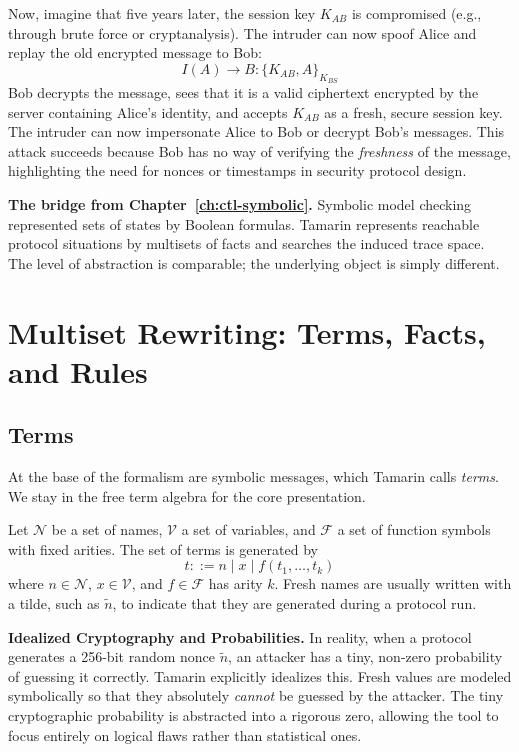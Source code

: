 Now, imagine that five years later, the session key $K_{AB}$ is compromised (e.g., through brute force or cryptanalysis). The intruder can now spoof Alice and replay the old encrypted message to Bob:
\[
  I(A) \to B : \{K_{AB}, A\}_{K_{BS}}
\]
Bob decrypts the message, sees that it is a valid ciphertext encrypted by the server containing Alice's identity, and accepts $K_{AB}$ as a fresh, secure session key. The intruder can now impersonate Alice to Bob or decrypt Bob's messages. This attack succeeds because Bob has no way of verifying the \emph{freshness} of the message, highlighting the need for nonces or timestamps in security protocol design.

\medskip\noindent
\textbf{The bridge from Chapter~\ref{ch:ctl-symbolic}.}  Symbolic model
checking represented sets of states by Boolean formulas.  Tamarin represents
reachable protocol situations by multisets of facts and searches the induced
trace space.  The level of abstraction is comparable; the underlying object
is simply different.


\section{Multiset Rewriting: Terms, Facts, and Rules}
\label{sec:tamarin-msr}

\subsection{Terms}

At the base of the formalism are symbolic messages, which Tamarin calls
\emph{terms}.  We stay in the free term algebra for the core presentation.

\begin{definition}[Terms]
\label{def:tamarin-terms}
Let $\mathcal{N}$ be a set of names, $\mathcal{V}$ a set of variables, and
$\mathcal{F}$ a set of function symbols with fixed arities.  The set of
terms is generated by
\[
  t ::= n \mid x \mid f(t_1,\dots,t_k)
\]
where $n \in \mathcal{N}$, $x \in \mathcal{V}$, and $f \in \mathcal{F}$ has
arity $k$.  Fresh names are usually written with a tilde, such as $\tilde n$,
to indicate that they are generated during a protocol run.
\end{definition}

\medskip\noindent
\textbf{Idealized Cryptography and Probabilities.} In reality, when a protocol generates a 256-bit random nonce $\tilde n$, an attacker has a tiny, non-zero probability of guessing it correctly. Tamarin explicitly idealizes this. Fresh values are modeled symbolically so that they absolutely \emph{cannot} be guessed by the attacker. The tiny cryptographic probability is abstracted into a rigorous zero, allowing the tool to focus entirely on logical flaws rather than statistical ones.

